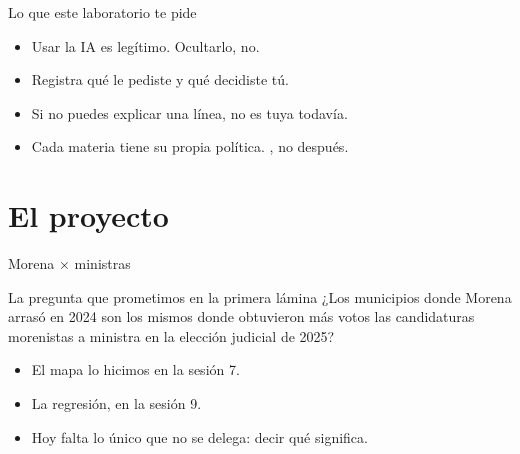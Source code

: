 \begin{frame}{Lo que este laboratorio te pide}
  \vspace{0.4em}
  \begin{itemize}\setlength{\itemsep}{0.85em}
    \item<1-> Usar la IA es legítimo. Ocultarlo, no.
    \item<2-> Registra qué le pediste y qué decidiste tú.
    \item<3-> Si no puedes explicar una línea, no es tuya todavía.
    \item<4-> Cada materia tiene su propia política. ,
          no después.
  \end{itemize}

  \vspace{1.1em}
\end{frame}

\section{El proyecto}

\begin{frame}{Morena × ministras}
  \vspace{0.3em}
  \begin{block}{La pregunta que prometimos en la primera lámina}
    ¿Los municipios donde Morena arrasó en 2024 son los mismos donde
    obtuvieron más votos las candidaturas morenistas a ministra en la
    elección judicial de 2025?
  \end{block}

  \vspace{0.9em}
  \begin{itemize}\setlength{\itemsep}{0.7em}
    \item<2-> El mapa lo hicimos en la sesión 7.
    \item<3-> La regresión, en la sesión 9.
    \item<4-> Hoy falta lo único que no se delega: decir qué significa.
  \end{itemize}
\end{frame}


